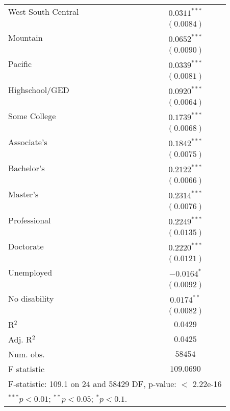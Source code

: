 \documentclass[letter]{article}
\begin{document}
\begin{table}
\begin{center}
\begin{tabular}{l c}
West South Central             & $0.0311^{***}$  \\
                               & $(0.0084)$      \\
Mountain                       & $0.0652^{***}$  \\
                               & $(0.0090)$      \\
Pacific                        & $0.0339^{***}$  \\
                               & $(0.0081)$      \\
Highschool/GED                 & $0.0920^{***}$  \\
                               & $(0.0064)$      \\
Some College                   & $0.1739^{***}$  \\
                               & $(0.0068)$      \\
Associate's                    & $0.1842^{***}$  \\
                               & $(0.0075)$      \\
Bachelor's                     & $0.2122^{***}$  \\
                               & $(0.0066)$      \\
Master's                       & $0.2314^{***}$  \\
                               & $(0.0076)$      \\
Professional                   & $0.2249^{***}$  \\
                               & $(0.0135)$      \\
Doctorate                      & $0.2220^{***}$  \\
                               & $(0.0121)$      \\
Unemployed                     & $-0.0164^{*}$   \\
                               & $(0.0092)$      \\
No disability                  & $0.0174^{**}$   \\
                               & $(0.0082)$      \\
\hline
R$^2$                          & $0.0429$        \\
Adj. R$^2$                     & $0.0425$        \\
Num. obs.                      & $58454$         \\
F statistic                    & $109.0690$      \\
\hline
\multicolumn{2}{l}{\scriptsize{F-statistic: 109.1 on 24 and 58429 DF, p-value: $<$ 2.22e-16}}\\
\multicolumn{2}{l}{\scriptsize{$^{***}p<0.01$; $^{**}p<0.05$; $^{*}p<0.1$.}}
\end{tabular}
\end{center}
\end{table}
\end{document}
